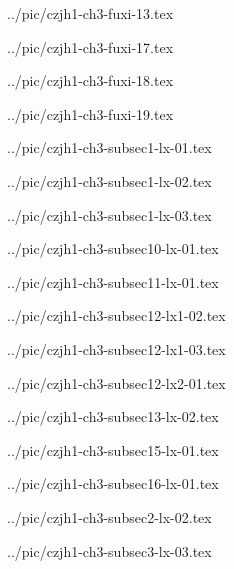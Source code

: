../pic/czjh1-ch3-fuxi-13.tex



../pic/czjh1-ch3-fuxi-17.tex



../pic/czjh1-ch3-fuxi-18.tex



../pic/czjh1-ch3-fuxi-19.tex



../pic/czjh1-ch3-subsec1-lx-01.tex



../pic/czjh1-ch3-subsec1-lx-02.tex



../pic/czjh1-ch3-subsec1-lx-03.tex



../pic/czjh1-ch3-subsec10-lx-01.tex



../pic/czjh1-ch3-subsec11-lx-01.tex



../pic/czjh1-ch3-subsec12-lx1-02.tex



../pic/czjh1-ch3-subsec12-lx1-03.tex



../pic/czjh1-ch3-subsec12-lx2-01.tex



../pic/czjh1-ch3-subsec13-lx-02.tex



../pic/czjh1-ch3-subsec15-lx-01.tex



../pic/czjh1-ch3-subsec16-lx-01.tex



../pic/czjh1-ch3-subsec2-lx-02.tex



../pic/czjh1-ch3-subsec3-lx-03.tex


